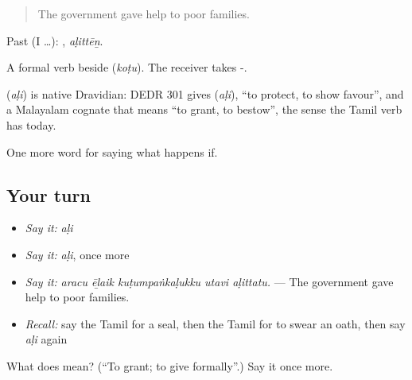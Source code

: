 \begin{quote}
The government gave help to poor families.
\end{quote}

Past (I …): , \emph{aḷittēṉ}.

A formal verb beside  (\emph{koṭu}). The receiver takes -.

\begin{cousinweb}
\textbf{} (\emph{aḷi}) is native Dravidian: DEDR 301 gives  (\emph{aḷi}), \textquotedblleft{}to protect, to show favour\textquotedblright{}, and a Malayalam cognate that means \textquotedblleft{}to grant, to bestow\textquotedblright{}, the sense the Tamil verb has today.
\end{cousinweb}

\begin{grammarlens}[title={What you've built}]
One more word for saying what happens if.
\end{grammarlens}

\subsection*{Your turn}
\begin{itemize}
\raggedright
  \item \emph{Say it:} \emph{aḷi}
  \item \emph{Say it:} \emph{aḷi}, once more
  \item \emph{Say it:} \emph{aracu ēḻaik kuṭumpaṅkaḷukku utavi aḷittatu.} — The government gave help to poor families.
  \item \emph{Recall:} say the Tamil for a seal, then the Tamil for to swear an oath, then say \emph{aḷi} again
\end{itemize}

\begin{tcolorbox}[breakable,colback=teal!4,colframe=teal!35!black,title={Before you move on}]
What does  mean? (\textquotedblleft{}To grant; to give formally\textquotedblright{}.) Say it once more.
\end{tcolorbox}
